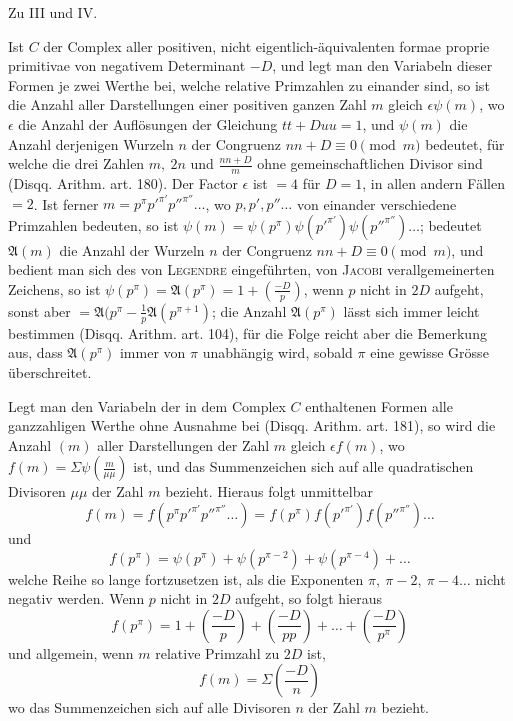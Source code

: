 \par\medskip{}\centerline{Zu III und IV.}\smallskip
Ist $C$ der Complex aller positiven, nicht eigentlich-äquivalenten formae proprie primitivae von negativem Determinant $-D$, und legt man den Variabeln dieser Formen je zwei Werthe bei, welche relative Primzahlen zu einander sind, so ist die Anzahl aller Darstellungen einer positiven ganzen Zahl $m$ gleich $\epsilon\psi(m)$, wo $\epsilon$ die Anzahl der Auflösungen der Gleichung $tt+Duu=1$, und $\psi(m)$ die Anzahl derjenigen Wurzeln $n$ der Congruenz $nn+D\equiv0\pmod m$ bedeutet, für welche die drei Zahlen $m,\ 2n$ und $\frac{nn+D}m$ ohne gemeinschaftlichen Divisor sind (Disqq. Arithm. art. 180). Der Factor $\epsilon$ ist $=4$ für $D=1$, in allen andern Fällen $=2$. Ist ferner $m=p^\pi p'^{\pi'}p''^{\pi''}\ldots$, wo $p,p',p''\ldots$ von einander verschiedene Primzahlen bedeuten, so ist $\psi(m)=\psi(p^\pi)\psi(p'^{\pi'})\psi(p''^{\pi''})\ldots$; bedeutet $\mathfrak A(m)$ die Anzahl der Wurzeln $n$ der Congruenz $nn+D\equiv0\pmod m$, und bedient man sich des von \textsc{Legendre} eingeführten, von \textsc{Jacobi} verallgemeinerten Zeichens, so ist $\psi(p^\pi)=\mathfrak A(p^\pi)=1+\left(\frac{-D}p\right)$, wenn $p$ nicht in $2D$ aufgeht, sonst aber $=\mathfrak A(p^\pi-\frac1p\mathfrak A(p^{\pi+1})$; die Anzahl $\mathfrak A(p^\pi)$ lässt sich immer leicht bestimmen (Disqq. Arithm. art. 104), für die Folge reicht aber die Bemerkung aus, dass $\mathfrak A(p^\pi)$ immer von $\pi$ unabhängig wird, sobald $\pi$ eine gewisse Grösse überschreitet.

Legt man den Variabeln der in dem Complex $C$ enthaltenen Formen alle ganzzahligen Werthe ohne Ausnahme bei (Disqq. Arithm. art. 181), so wird die Anzahl $(m)$ aller Darstellungen der Zahl $m$ gleich $\epsilon f(m)$, wo $f(m)=\Sigma\psi\left(\frac m{\mu\mu}\right)$ ist, und das Summenzeichen sich auf alle quadratischen Divisoren $\mu\mu$ der Zahl $m$ bezieht. Hieraus folgt unmittelbar
\[
f(m)=f(p^\pi p'^{\pi'}p''^{\pi''}\ldots)=f(p^\pi)f(p'^{\pi'})f(p''^{\pi''})\ldots
\]
und
\[
f(p^\pi)=\psi(p^\pi)+\psi(p^{\pi-2})+\psi(p^{\pi-4})+\ldots
\]
welche Reihe so lange fortzusetzen ist, als die Exponenten $\pi,\ \pi-2,\ \pi-4\ldots$ nicht negativ werden. Wenn $p$ nicht in $2D$ aufgeht, so folgt hieraus
\[
f(p^\pi)=1+\left(\frac{-D}p\right)+\left(\frac{-D}{pp}\right)+\ldots+\left(\frac{-D}{p^\pi}\right)
\]
und allgemein, wenn $m$ relative Primzahl zu $2D$ ist,
\[
f(m)=\Sigma\left(\frac{-D}n\right)
\]
wo das Summenzeichen sich auf alle Divisoren $n$ der Zahl $m$ bezieht.

